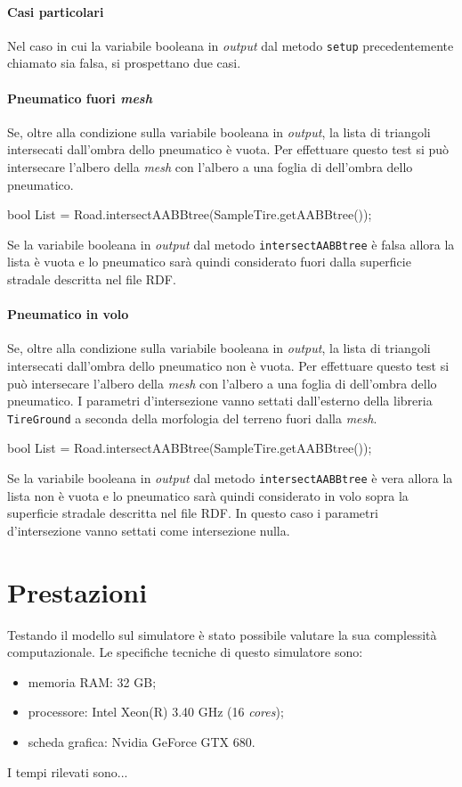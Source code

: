\paragraph{Casi particolari}
Nel caso in cui la variabile booleana in \textit{output} dal metodo \texttt{setup} precedentemente chiamato sia falsa, si prospettano due casi.
%
\paragraph{Pneumatico fuori \textit{mesh}} Se, oltre alla condizione sulla variabile booleana in \textit{output}, la lista di triangoli intersecati dall'ombra dello pneumatico è vuota. Per effettuare questo test si può intersecare l'albero della \textit{mesh} con l'albero a una foglia di dell'ombra dello pneumatico.
\begin{pseudoc}
	bool List = Road.intersectAABBtree(SampleTire.getAABBtree());
\end{pseudoc}
Se la variabile booleana in \textit{output} dal metodo \texttt{intersectAABBtree} è falsa allora la lista è vuota e lo pneumatico sarà quindi considerato fuori dalla superficie stradale descritta nel file \ac{RDF}.
%
\paragraph{Pneumatico in volo}
Se, oltre alla condizione sulla variabile booleana in \textit{output}, la lista di triangoli intersecati dall'ombra dello pneumatico non è vuota. Per effettuare questo test si può intersecare l'albero della \textit{mesh} con l'albero a una foglia di dell'ombra dello pneumatico. I parametri d'intersezione vanno settati dall'esterno della libreria \texttt{TireGround} a seconda della morfologia del terreno fuori dalla \textit{mesh}.
\begin{pseudoc}
	bool List = Road.intersectAABBtree(SampleTire.getAABBtree());
\end{pseudoc}
Se la variabile booleana in \textit{output} dal metodo \texttt{intersectAABBtree} è vera allora la lista non è vuota e lo pneumatico sarà quindi considerato in volo sopra la superficie stradale descritta nel file \ac{RDF}. In questo caso i parametri d'intersezione vanno settati come intersezione nulla.
%
\section{Prestazioni}
Testando il modello sul simulatore è stato possibile valutare la sua complessità computazionale. Le specifiche tecniche di questo simulatore sono:
\begin{itemize}
	\item memoria RAM: 32 GB;
	\item processore: Intel Xeon(R) 3.40 GHz (16 \textit{cores});
	\item scheda grafica: Nvidia GeForce GTX 680.
\end{itemize}

I tempi rilevati sono...

